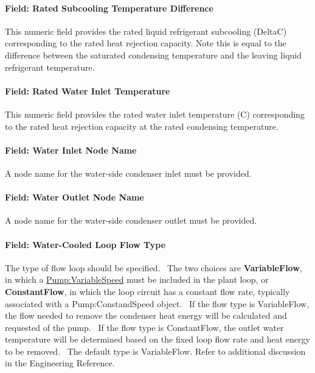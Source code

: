\paragraph{Field: Rated Subcooling Temperature Difference}\label{field-rated-subcooling-temperature-difference-2}

This numeric field provides the rated liquid refrigerant subcooling (DeltaC) corresponding to the rated heat rejection capacity. Note this is equal to the difference between the saturated condensing temperature and the leaving liquid refrigerant temperature.

\paragraph{Field: Rated Water Inlet Temperature}\label{field-rated-water-inlet-temperature}

This numeric field provides the rated water inlet temperature (C) corresponding to the rated heat rejection capacity at the rated condensing temperature.

\paragraph{Field: Water Inlet Node Name}\label{field-water-inlet-node-name-002}

A node name for the water-side condenser inlet must be provided.

\paragraph{Field: Water Outlet Node Name}\label{field-water-outlet-node-name-001}

A node name for the water-side condenser outlet must be provided.

\paragraph{Field: Water-Cooled Loop Flow Type}\label{field-water-cooled-loop-flow-type-1}

The type of flow loop should be specified.~ The two choices are \textbf{VariableFlow}, in which a \hyperref[pumpvariablespeed]{Pump:VariableSpeed} must be included in the plant loop, or \textbf{ConstantFlow}, in which the loop circuit has a constant flow rate, typically associated with a Pump:ConstandSpeed object.~ If the flow type is VariableFlow, the flow needed to remove the condenser heat energy will be calculated and requested of the pump.~ If the flow type is ConstantFlow, the outlet water temperature will be determined based on the fixed loop flow rate and heat energy to be removed.~ The default type is VariableFlow. Refer to additional discussion in the Engineering Reference.


